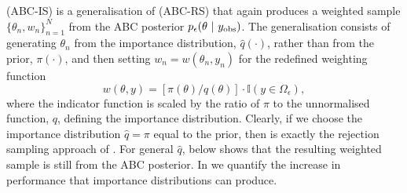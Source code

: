 \documentclass[review]{siamonline190516}
\begin{document}
 (ABC-IS) is a generalisation of  (ABC-RS) that again produces a weighted sample $\{ \theta_n, w_n \}_{n=1}^N$ from the ABC posterior $p_\epsilon(\theta~|~y_{\mathrm{obs}})$.
The generalisation consists of generating $\theta_n$ from the importance distribution, $\hat q(\cdot)$, rather than from the prior, $\pi(\cdot)$, and then setting $w_n = w(\theta_n, y_n)$ for the redefined weighting function
\begin{equation}
 \label{eq:ImportanceWeight}
 w(\theta, y) = \left[ \pi(\theta) \big/ q(\theta) \right] \cdot \mathbb I(y \in \Omega_\epsilon),
\end{equation}
where the indicator function is scaled by the ratio of $\pi$ to the unnormalised function, $q$, defining the importance distribution.
Clearly, if we choose the importance distribution $\hat q = \pi$ equal to the prior, then  is exactly the rejection sampling approach of .
For general $\hat q$,  below shows that the resulting weighted sample is still from the ABC posterior.
In  we quantify the increase in performance that importance distributions can produce.

\begin{algorithm}
\caption{Importance sampling ABC (ABC-IS)}
\label{ABC:Importance}
\begin{algorithmic}[1]
\REPEAT{}
\end{algorithmic}
\end{algorithm}
\end{document}
